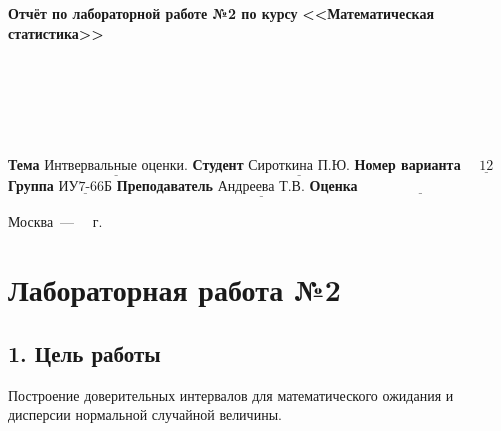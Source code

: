 \documentclass[12pt]{report}
\begin{document}
\begin{titlepage}
	
	\begin{center}
		\noindent\begin{minipage}{1.3\textwidth}\centering
			\Large\textbf{  Отчёт по лабораторной работе №2 по курсу}\newline\newline
			\textbf{<<Математическая статистика>>}\newline
		\end{minipage}
	\end{center}
	
	~\\\\\\\\\\
	\large
	\noindent\textbf{Тема } $\underline{\text{Интвервальные оценки.}}$\newline\newline
	\noindent\textbf{Студент } $\underline{\text{Сироткина П.Ю.}}$\newline\newline
	\noindent\textbf{Номер варианта} $\underline{\text{~~~12~~~}}$\newline\newline
	\noindent\textbf{Группа } $\underline{\text{ИУ7-66Б}}$\newline\newline
	\noindent\textbf{Преподаватель } $\underline{\text{Андреева Т.В.}}$\newline\newline
	\noindent\textbf{Оценка } $\underline{\text{~~~~~~~~~~~~~~~~~~~~~~~~~}}$\newline\newline
	
	\begin{center}
		\vfill
		Москва~---~\the\year
		~г.
	\end{center}
\end{titlepage}

\chapter*{Лабораторная работа №2}

\section*{1. Цель работы}

Построение доверительных интервалов для математического ожидания и дисперсии нормальной случайной величины.
\end{document}
